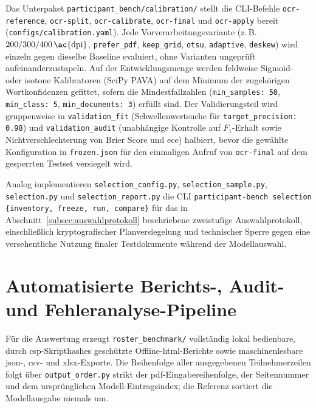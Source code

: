 Das Unterpaket \texttt{participant\_bench/calibration/} stellt die CLI-Befehle \texttt{ocr-reference}, \texttt{ocr-split}, \texttt{ocr-calibrate}, \texttt{ocr-final} und \texttt{ocr-apply} bereit (\texttt{configs/calibration.yaml}). Jede Vorverarbeitungsvariante (z.\,B.\ $200/300/400\,\text{\ac{dpi}}$, \texttt{prefer\_pdf}, \texttt{keep\_grid}, \texttt{otsu}, \texttt{adaptive}, \texttt{deskew}) wird einzeln gegen dieselbe Baseline evaluiert, ohne Varianten ungeprüft aufeinanderzustapeln. Auf der Entwicklungsmenge werden feldweise Sigmoid- oder isotone Kalibratoren (SciPy PAVA) auf dem Minimum der zugehörigen Wortkonfidenzen gefittet, sofern die Mindestfallzahlen (\texttt{min\_samples: 50}, \texttt{min\_class: 5}, \texttt{min\_documents: 3}) erfüllt sind. Der Validierungsteil wird gruppenweise in \texttt{validation\_fit} (Schwellenwertsuche für \texttt{target\_precision: 0.98}) und \texttt{validation\_audit} (unabhängige Kontrolle auf $F_1$-Erhalt sowie Nichtverschlechterung von Brier Score und \ac{ece}) halbiert, bevor die gewählte Konfiguration in \texttt{frozen.json} für den einmaligen Aufruf von \texttt{ocr-final} auf dem gesperrten Testset versiegelt wird.

Analog implementieren \texttt{selection\_config.py}, \texttt{selection\_sample.py}, \texttt{selection.py} und \texttt{selection\_report.py} die CLI \texttt{participant-bench selection \{inventory, freeze, run, compare\}} für das in Abschnitt~\ref{subsec:auswahlprotokoll} beschriebene zweistufige Auswahlprotokoll, einschließlich kryptografischer Planversiegelung und technischer Sperre gegen eine versehentliche Nutzung finaler Testdokumente während der Modellauswahl.

\section{Automatisierte Berichts-, Audit- und Fehleranalyse-Pipeline}
\label{sec:umsetzung-berichte}

Für die Auswertung erzeugt \texttt{roster\_benchmark/} vollständig lokal bedienbare, durch \ac{csp}-Skripthashes geschützte Offline-\ac{html}-Berichte sowie maschinenlesbare \ac{json}-, \ac{csv}- und \ac{xlsx}-Exporte. Die Reihenfolge aller ausgegebenen Teilnehmerzeilen folgt über \texttt{output\_order.py} strikt der \ac{pdf}-Eingabereihenfolge, der Seitennummer und dem ursprünglichen Modell-Eintragsindex; die Referenz sortiert die Modellausgabe niemals um.

